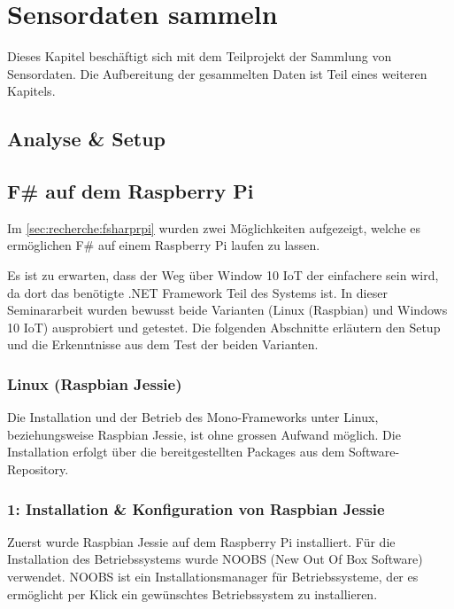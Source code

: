 
\chapter{Sensordaten sammeln}
Dieses Kapitel beschäftigt sich mit dem Teilprojekt der Sammlung von Sensordaten. Die Aufbereitung der gesammelten Daten ist Teil eines weiteren Kapitels.


\section{Analyse \& Setup}
\section{F\# auf dem Raspberry Pi}
Im \cref{sec:recherche:fsharprpi}  wurden zwei Möglichkeiten aufgezeigt, welche es ermöglichen F\# auf einem Raspberry Pi laufen zu lassen.

Es ist zu erwarten, dass der Weg über Window 10 IoT der einfachere sein wird, da dort das benötigte .NET Framework Teil des Systems ist. In dieser Seminararbeit wurden bewusst beide Varianten (Linux (Raspbian) und Windows 10 IoT) ausprobiert und getestet. Die folgenden Abschnitte erläutern den Setup und die Erkenntnisse aus dem Test der beiden Varianten. 

\subsection{Linux (Raspbian Jessie)}
Die Installation und der Betrieb des Mono-Frameworks unter Linux, beziehungsweise Raspbian Jessie, ist ohne grossen Aufwand möglich. Die Installation erfolgt über die bereitgestellten Packages aus dem Software-Repository.

\subsection{1: Installation \& Konfiguration von Raspbian Jessie}
Zuerst wurde Raspbian Jessie auf dem Raspberry Pi installiert. Für die Installation des Betriebssystems wurde NOOBS (New Out Of Box Software) verwendet. NOOBS ist ein Installationsmanager für Betriebssysteme, der es ermöglicht per Klick ein gewünschtes Betriebssystem zu installieren.


